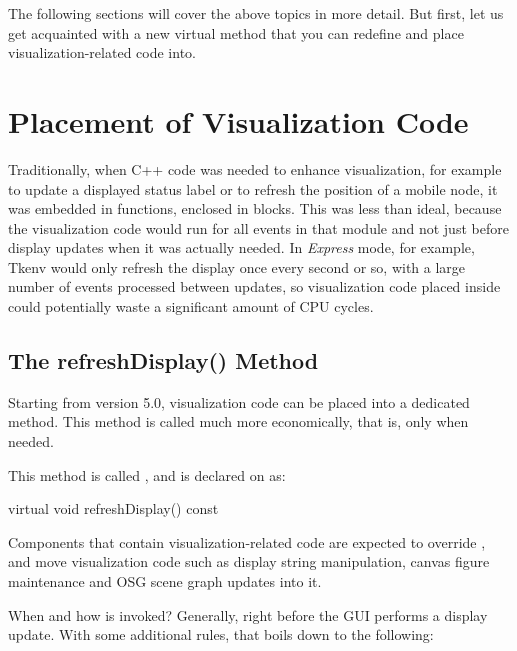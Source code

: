 The following sections will cover the above topics in more detail. But first,
let us get acquainted with a new  virtual method that you
can redefine and place visualization-related code into.


\section{Placement of Visualization Code}
\label{sec:graphics:refreshdisplay}

Traditionally, when C++ code was needed to enhance visualization, for
example to update a displayed status label or to refresh the position of a
mobile node, it was embedded in  functions, enclosed
in  blocks. This was less than ideal, because the
visualization code would run for all events in that module and not just
before display updates when it was actually needed. In \textit{Express} mode,
for example, Tkenv would only refresh the display once every second or so,
with a large number of events processed between updates, so visualization
code placed inside  could potentially waste a
significant amount of CPU cycles.


\subsection{The refreshDisplay() Method}
\label{sec:graphics:refreshdisplay-usage-and-semantics}

Starting from {\opp} version 5.0, visualization code can be placed into a
dedicated method. This method is called much more economically, that is, only
when needed.

This method is called , and is declared on
 as:

\begin{cpp}
virtual void refreshDisplay() const {}
\end{cpp}

Components that contain visualization-related code are expected to override
, and move visualization code such as display string
manipulation, canvas figure maintenance and OSG scene graph updates into it.

When and how is  invoked? Generally, right before
the GUI performs a display update. With some additional rules, that boils
down to the following:

